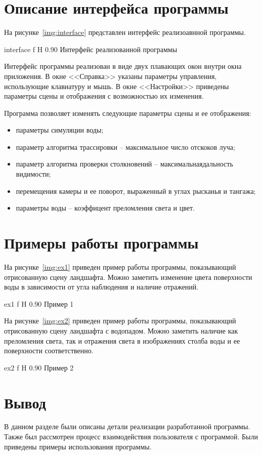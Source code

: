 \section{Описание интерфейса программы}

На рисунке~\ref{img:interface} представлен интерфейс реализоавнной программы.

    {interface}
    {f}
    {H}
    {0.90\textwidth}
    {Интерфейс реализованной программы}

Интерфейс программы реализован в виде двух плавающих окон внутри окна приложения.
В окне <<Справка>> указаны параметры управления, использующие клавиатуру и мышь.
В окне <<Настройки>> приведены параметры сцены и отображения с возможностью их изменения.

Программа позволяет изменять следующие параметры сцены и ее отображения:
\begin{itemize}
    \item параметры симуляции воды;
    \item параметр алгоритма трассировки -- максимальное число отскоков луча;
    \item параметр алгоритма проверки столкновений -- максимальнаядальность видимости;
    \item перемещения камеры и ее поворот, выраженный в углах рысканья и тангажа;
    \item параметры воды -- коэффицент преломления света и цвет.
\end{itemize}

\section{Примеры работы программы}

На рисунке~\ref{img:ex1} приведен пример работы программы, показывающий отрисованную 
сцену ландшафта. Можно заметить изменение цвета поверхности воды в зависимости
от угла наблюдения и наличие отражений.

    {ex1}
    {f}
    {H}
    {0.90\textwidth}
    {Пример 1}

На рисунке~\ref{img:ex2} приведен пример работы программы, показывающий отрисованную сцену ландшафта
с водопадом. Можно заметить наличие как преломления света, так и отражения света 
в изображениях столба воды и ее поверхности соответственно.

    {ex2}
    {f}
    {H}
    {0.90\textwidth}
    {Пример 2}

\section*{Вывод}

В данном разделе были описаны детали реализации разработанной программы. 
Также был рассмотрен процесс взаимодействия пользователя с программой.
Были приведены примеры использования программы.

